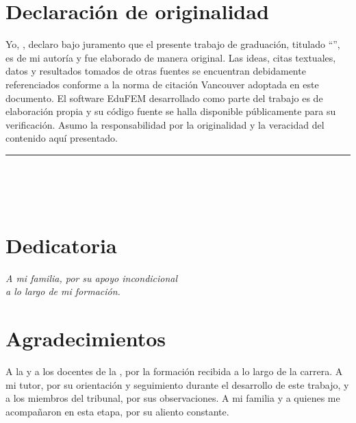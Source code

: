 
\chapter*{Declaración de originalidad}

\noindent Yo, \autorTesis, declaro bajo juramento que el presente trabajo de graduación, titulado \enquote{\tituloTesis}, es de mi autoría y fue elaborado de manera original. Las ideas, citas textuales, datos y resultados tomados de otras fuentes se encuentran debidamente referenciados conforme a la norma de citación Vancouver adoptada en este documento. El software EduFEM desarrollado como parte del trabajo es de elaboración propia y su código fuente se halla disponible públicamente para su verificación. Asumo la responsabilidad por la originalidad y la veracidad del contenido aquí presentado.

\vspace{2.5cm}
\begin{center}
\rule{7cm}{0.4pt}\\[2pt]
\autorTesis\\
\carrera\\
\ciudadTesis
\end{center}

\chapter*{Dedicatoria}
\vspace*{4cm}
\begin{flushright}
\itshape
A mi familia, por su apoyo incondicional\\
a lo largo de mi formación.
\end{flushright}

\chapter*{Agradecimientos}

A la \universidad{} y a los docentes de la \carrera{}, por la formación recibida a lo largo de la carrera. A mi tutor, por su orientación y seguimiento durante el desarrollo de este trabajo, y a los miembros del tribunal, por sus observaciones. A mi familia y a quienes me acompañaron en esta etapa, por su aliento constante.
